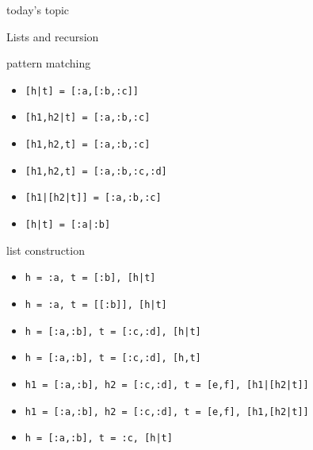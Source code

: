 \begin{frame}{today's topic}

\vspace{60pt}\hspace{80pt}Lists and recursion

\end{frame}

\begin{frame}{pattern matching}
\begin{itemize}
\pause \item  {\tt [h|t] = [:a,[:b,:c]]}  
\pause \item  {\tt [h1,h2|t] = [:a,:b,:c]} 
\pause \item  {\tt [h1,h2,t] = [:a,:b,:c]} 
\pause \item  {\tt [h1,h2,t] = [:a,:b,:c,:d]} 
\pause \item  {\tt [h1|[h2|t]] = [:a,:b,:c]}
\pause \item  {\tt [h|t] = [:a|:b]}
\end{itemize}
\end{frame}

\begin{frame}{list construction}
\begin{itemize}
\pause \item  {\tt h = :a, t = [:b], [h|t]}
\pause \item  {\tt h = :a, t = [[:b]], [h|t]}
\pause \item  {\tt h = [:a,:b], t = [:c,:d], [h|t]}
\pause \item  {\tt h = [:a,:b], t = [:c,:d], [h,t]}
\pause \item  {\tt h1 = [:a,:b], h2 = [:c,:d], t = [e,f], [h1|[h2|t]]}
\pause \item  {\tt h1 = [:a,:b], h2 = [:c,:d], t = [e,f], [h1,[h2|t]]}
\pause \item  {\tt h = [:a,:b], t = :c, [h|t]}
\end{itemize}
\end{frame}


